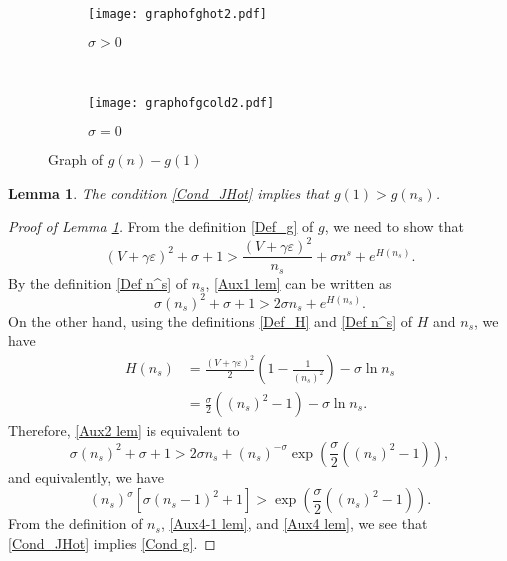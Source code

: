 \documentclass{amsart}
\newcommand{\veps}{\varepsilon}
\numberwithin{equation}{section}
\theoremstyle{plain}%
\newtheorem{lemma}[theorem]{Lemma}
\theoremstyle{definition}
\theoremstyle{remark}
\theoremstyle{remark}
\begin{document}
\begin{figure}[h]
        \begin{subfigure}[b]{0.5\textwidth}
        \texttt{[image: graphofghot2.pdf]}
        \caption{$\sigma>0$}
        \label{graphfofghot}
    \end{subfigure}
    ~  %
    \begin{subfigure}[b]{0.5\textwidth}
        \texttt{[image: graphofgcold2.pdf]}
        \caption{$\sigma=0$}
        \label{graphfofgcold}
    \end{subfigure}
    \caption{Graph of $g(n)-g(1)$}\label{graphofg}
    \label{FigGraph g}
\end{figure}

\begin{lemma}\label{LemCond_g}
The condition \eqref{Cond_JHot} implies that $g(1)>g(n_s)$.
\end{lemma}

\begin{proof}[Proof of Lemma \ref{LemCond_g}]
From the definition \eqref{Def_g} of $g$, we need to show that
\begin{equation}\label{Aux1 lem}
(V+\gamma\veps)^2 + \sigma + 1 > \frac{(V+\gamma\veps)^2}{n_s} + \sigma n^s + e^{H(n_s)}.
\end{equation}
By the definition \eqref{Def n^s} of $n_s$, \eqref{Aux1 lem} can be written as 
\begin{equation}\label{Aux2 lem}
\sigma(n_s)^2 + \sigma + 1 > 2\sigma n_s +  e^{H(n_s)}.
\end{equation}
On the other hand, using the definitions \eqref{Def_H} and \eqref{Def n^s} of $H$ and $n_s$, we have
\[
\begin{split}
H(n_s)
& =\frac{(V+\gamma\veps)^2}{2}\left(1 - \frac{1}{(n_s)^2} \right)  - \sigma\ln n_s  \\
& = \frac{\sigma}{2}\left((n_s)^2 - 1 \right) - \sigma\ln n_s.
\end{split}
\]
Therefore, \eqref{Aux2 lem} is equivalent to
\[
\sigma(n_s)^2 + \sigma + 1 > 2\sigma n_s + (n_s)^{-\sigma} \exp \left(\frac{\sigma}{2}\left((n_s)^2 - 1 \right) \right),
\]
and equivalently, we have
\begin{equation}\label{Aux4 lem}
(n_s)^{\sigma}\left[\sigma(n_s - 1)^2 + 1 \right] > \exp \left(\frac{\sigma}{2}\left((n_s)^2 - 1 \right) \right).
\end{equation}
From the definition of $n_s$, \eqref{Aux4-1 lem}, and \eqref{Aux4 lem}, we see that \eqref{Cond_JHot} implies \eqref{Cond g}.
\end{proof}
\end{document}
